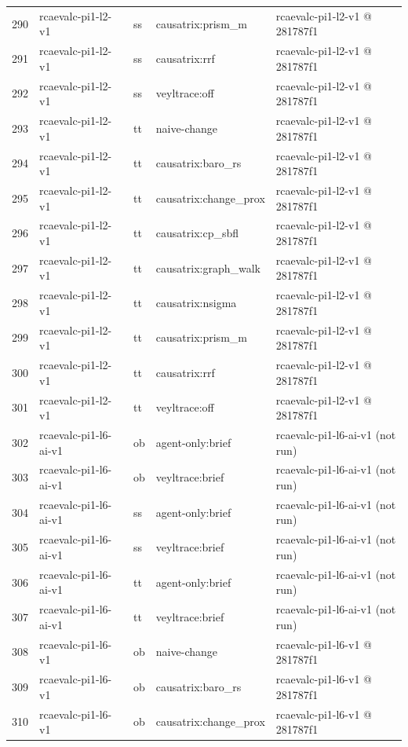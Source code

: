 \begin{longtable}{@{}r>{\raggedright\arraybackslash}p{87.0pt}>{\raggedright\arraybackslash}p{18.0pt}>{\raggedright\arraybackslash}p{63.0pt}>{\raggedright\arraybackslash}p{108.0pt}@{}}
290 & rcaevalc-pi1-l2-v1 & ss & causatrix:prism\_m & rcaevalc-pi1-l2-v1 @ 281787f1 \\
291 & rcaevalc-pi1-l2-v1 & ss & causatrix:rrf & rcaevalc-pi1-l2-v1 @ 281787f1 \\
292 & rcaevalc-pi1-l2-v1 & ss & veyltrace:off & rcaevalc-pi1-l2-v1 @ 281787f1 \\
293 & rcaevalc-pi1-l2-v1 & tt & naive-change & rcaevalc-pi1-l2-v1 @ 281787f1 \\
294 & rcaevalc-pi1-l2-v1 & tt & causatrix:baro\_rs & rcaevalc-pi1-l2-v1 @ 281787f1 \\
295 & rcaevalc-pi1-l2-v1 & tt & causatrix:change\_prox & rcaevalc-pi1-l2-v1 @ 281787f1 \\
296 & rcaevalc-pi1-l2-v1 & tt & causatrix:cp\_sbfl & rcaevalc-pi1-l2-v1 @ 281787f1 \\
297 & rcaevalc-pi1-l2-v1 & tt & causatrix:graph\_walk & rcaevalc-pi1-l2-v1 @ 281787f1 \\
298 & rcaevalc-pi1-l2-v1 & tt & causatrix:nsigma & rcaevalc-pi1-l2-v1 @ 281787f1 \\
299 & rcaevalc-pi1-l2-v1 & tt & causatrix:prism\_m & rcaevalc-pi1-l2-v1 @ 281787f1 \\
300 & rcaevalc-pi1-l2-v1 & tt & causatrix:rrf & rcaevalc-pi1-l2-v1 @ 281787f1 \\
301 & rcaevalc-pi1-l2-v1 & tt & veyltrace:off & rcaevalc-pi1-l2-v1 @ 281787f1 \\
302 & rcaevalc-pi1-l6-ai-v1 & ob & agent-only:brief & rcaevalc-pi1-l6-ai-v1 (not run) \\
303 & rcaevalc-pi1-l6-ai-v1 & ob & veyltrace:brief & rcaevalc-pi1-l6-ai-v1 (not run) \\
304 & rcaevalc-pi1-l6-ai-v1 & ss & agent-only:brief & rcaevalc-pi1-l6-ai-v1 (not run) \\
305 & rcaevalc-pi1-l6-ai-v1 & ss & veyltrace:brief & rcaevalc-pi1-l6-ai-v1 (not run) \\
306 & rcaevalc-pi1-l6-ai-v1 & tt & agent-only:brief & rcaevalc-pi1-l6-ai-v1 (not run) \\
307 & rcaevalc-pi1-l6-ai-v1 & tt & veyltrace:brief & rcaevalc-pi1-l6-ai-v1 (not run) \\
308 & rcaevalc-pi1-l6-v1 & ob & naive-change & rcaevalc-pi1-l6-v1 @ 281787f1 \\
309 & rcaevalc-pi1-l6-v1 & ob & causatrix:baro\_rs & rcaevalc-pi1-l6-v1 @ 281787f1 \\
310 & rcaevalc-pi1-l6-v1 & ob & causatrix:change\_prox & rcaevalc-pi1-l6-v1 @ 281787f1 \\

\end{longtable}
